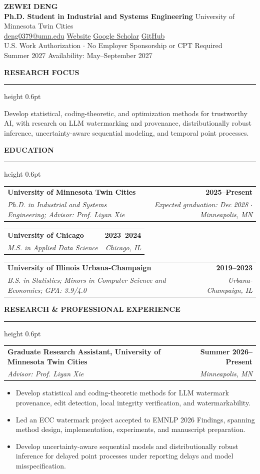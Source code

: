 \documentclass[10pt,letterpaper]{article}
\makeatletter
\newcommand{\cvsection}[1]{%
  \vspace{4.5pt}
  {\color{umnmaroon}\bfseries\normalsize #1}\par
  \vspace{1.2pt}
  {\color{rulegray}\hrule height 0.6pt}
  \vspace{2.5pt}
}
\newcommand{\entry}[4]{%
  \begin{tabularx}{\textwidth}{@{}Xr@{}}
    \textbf{#1} & \textbf{#2}\\[-1pt]
    \textit{#3} & {\color{muted}\textit{#4}}
  \end{tabularx}
}
\makeatother
\begin{document}
\RaggedRight

\begin{center}
  {\fontsize{18}{19}\selectfont\bfseries ZEWEI DENG}\\[1pt]
  {\color{umnmaroon}\bfseries Ph.D. Student in Industrial and Systems Engineering}
  \enspace\textbar\enspace University of Minnesota Twin Cities\\[2.5pt]
  \small
  \href{mailto:deng0379@umn.edu}{deng0379@umn.edu}
  \enspace\textbar\enspace
  \href{https://zeweid1221.github.io/personal-website/}{Website}
  \enspace\textbar\enspace
  \href{https://scholar.google.com/citations?user=fqZL5BoAAAAJ}{Google Scholar}
  \enspace\textbar\enspace
  \href{https://github.com/zeweid1221}{GitHub}\\[1.5pt]
  {\color{muted}U.S. Work Authorization \(\cdot\) No Employer Sponsorship or CPT Required}\\[1.2pt]
  {\color{muted}Summer 2027 Availability: May--September 2027}
\end{center}
\vspace{-2pt}

\cvsection{RESEARCH FOCUS}
Develop statistical, coding-theoretic, and optimization methods for trustworthy AI, with research on LLM watermarking and provenance, distributionally robust inference, uncertainty-aware sequential modeling, and temporal point processes.

\cvsection{EDUCATION}
\entry{University of Minnesota Twin Cities}{2025--Present}{Ph.D. in Industrial and Systems Engineering; Advisor: Prof. Liyan Xie}{Expected graduation: Dec 2028 \(\cdot\) Minneapolis, MN}
\vspace{2.5pt}
\entry{University of Chicago}{2023--2024}{M.S. in Applied Data Science}{Chicago, IL}
\vspace{2.5pt}
\entry{University of Illinois Urbana-Champaign}{2019--2023}{B.S. in Statistics; Minors in Computer Science and Economics; GPA: 3.9/4.0}{Urbana-Champaign, IL}

\cvsection{RESEARCH \& PROFESSIONAL EXPERIENCE}
\entry{Graduate Research Assistant, University of Minnesota Twin Cities}{Summer 2026--Present}{Advisor: Prof. Liyan Xie}{Minneapolis, MN}
\begin{itemize}
  \item Develop statistical and coding-theoretic methods for LLM watermark provenance, edit detection, local integrity verification, and watermarkability.
  \item Led an ECC watermark project accepted to EMNLP 2026 Findings, spanning method design, implementation, experiments, and manuscript preparation.
  \item Develop uncertainty-aware sequential models and distributionally robust inference for delayed point processes under reporting delays and model misspecification.
\end{itemize}
\end{document}
